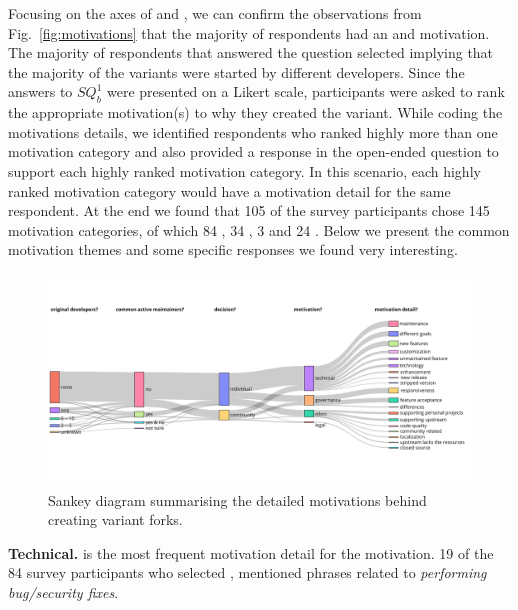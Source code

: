 Focusing on the axes of  and , we can confirm the observations from Fig.~\ref{fig:motivations} that the majority of respondents had an  and  motivation.
The majority of respondents that answered the question  selected  implying that the majority of the variants were started by different developers.
Since the answers to $SQ^1_{b}$ were presented on a Likert scale, participants were asked to rank the appropriate motivation(s) to why they created the variant. While coding the motivations details, we identified respondents who ranked highly more than one motivation category and also provided a response in the open-ended question to support each highly ranked motivation category. In this scenario, each highly ranked motivation category would have a motivation detail for the same respondent. %
At the end we found that 105 of the survey participants chose 145 motivation categories, of which 84 , 34 , 3  and 24 . Below we present the common motivation themes and some  specific responses we found very
interesting.

\begin{figure}[ht]
\begin{center}
    \centering
    \includegraphics[width=\textwidth]{pdfs/sankey_motivations_2.pdf}
    \caption{Sankey diagram summarising the detailed motivations behind creating variant forks.
    }
    \label{fig:sankey_motivation}
\end{center}
\vspace{-.3cm}
\end{figure}

\nd \textbf{Technical.}  is the most frequent motivation detail for the  motivation. 19 of the 84 survey participants who selected , mentioned phrases related to \emph{performing bug/security fixes}.

